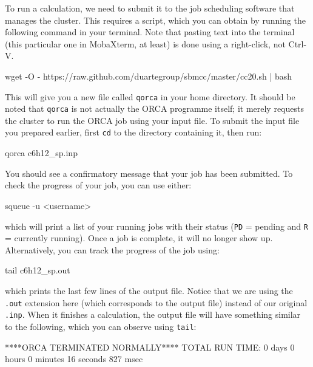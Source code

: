 \documentclass[10pt]{article}
\begin{document}
To run a calculation, we need to submit it to the job scheduling software that manages the cluster. This requires a script, which you can obtain by running the following command in your terminal. Note that pasting text into the terminal (this particular one in MobaXterm, at least) is done using a right-click, not Ctrl-V. 

\begin{cmdline}
wget -O - https://raw.github.com/duartegroup/sbmcc/master/cc20.sh | bash
\end{cmdline}

This will give you a new file called \texttt{qorca} in your home directory. It should be noted that \texttt{qorca} is not actually the ORCA programme itself; it merely requests the cluster to run the ORCA job using your input file.  To submit the input file you prepared earlier, first \texttt{cd} to the directory containing it, then run:

\begin{cmdline}
qorca c6h12_sp.inp
\end{cmdline}

You should see a confirmatory message that your job has been submitted. To check the progress of your job, you can use either:

\begin{cmdline}
squeue -u <username>
\end{cmdline}

which will print a list of your running jobs with their status (\texttt{PD} = pending and \texttt{R} = currently running). Once a job is complete, it will no longer show up. Alternatively, you can track the progress of the job using:

\begin{cmdline}
tail c6h12_sp.out
\end{cmdline}

which prints the last few lines of the output file. Notice that we are using the \texttt{.out} extension here (which corresponds to the output file) instead of our original \texttt{.inp}. When it finishes a calculation, the output file will have something similar to the following, which you can observe using \texttt{tail}:

\begin{cmdline}
              ****ORCA TERMINATED NORMALLY****
TOTAL RUN TIME: 0 days 0 hours 0 minutes 16 seconds 827 msec
\end{cmdline}
\end{document}
